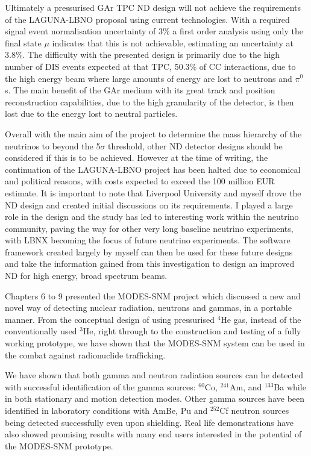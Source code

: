 Ultimately a pressurised GAr TPC ND design will not achieve the requirements of the LAGUNA-LBNO proposal using current technologies. With a required signal event normalisation uncertainty of 3\% a first order analysis using only the final state $\mu$ indicates that this is not achievable, estimating an uncertainty at 3.8\%. The difficulty with the presented design is primarily due to the high number of DIS events expected at that TPC, 50.3\% of CC interactions, due to the high energy beam where large amounts of energy are lost to neutrons and $\pi^{0}$s. The main benefit of the GAr medium with its great track and position reconstruction capabilities, due to the high granularity of the detector, is then lost due to the energy lost to neutral particles. 

Overall with the main aim of the project to determine the mass hierarchy of the neutrinos to beyond the 5$\sigma$ threshold, other ND detector designs should be considered if this is to be achieved. However at the time of writing, the continuation of the LAGUNA-LBNO project has been halted due to economical and political reasons, with costs expected to exceed the 100 million EUR estimate. It is important to note that Liverpool University and myself drove the ND design and created initial discussions on its requirements. I played a large role in the design and the study has led to interesting work within the neutrino community, paving the way for other very long baseline neutrino experiments, with LBNX becoming the focus of future neutrino experiments. The software framework created largely by myself can then be used for these future designs and take the information gained from this investigation to design an improved ND for high energy, broad spectrum beams.

Chapters 6 to 9 presented the MODES-SNM project which discussed a new and novel way of detecting nuclear radiation, neutrons and gammas, in a portable manner. From the conceptual design of using pressurised $^{4}$He gas, instead of the conventionally used $^{3}$He, right through to the construction and testing of a fully working prototype, we have shown that the MODES-SNM system can be used in the combat against radionuclide trafficking. 

We have shown that both gamma and neutron radiation sources can be detected with successful identification of the gamma sources: $^{60}$Co, $^{241}$Am, and $^{133}$Ba while in both stationary and motion detection modes. Other gamma sources have been identified in laboratory conditions with AmBe, Pu and $^{252}$Cf neutron sources being detected successfully even upon shielding. Real life demonstrations have also showed promising results with many end users interested in the potential of the MODES-SNM prototype. 


